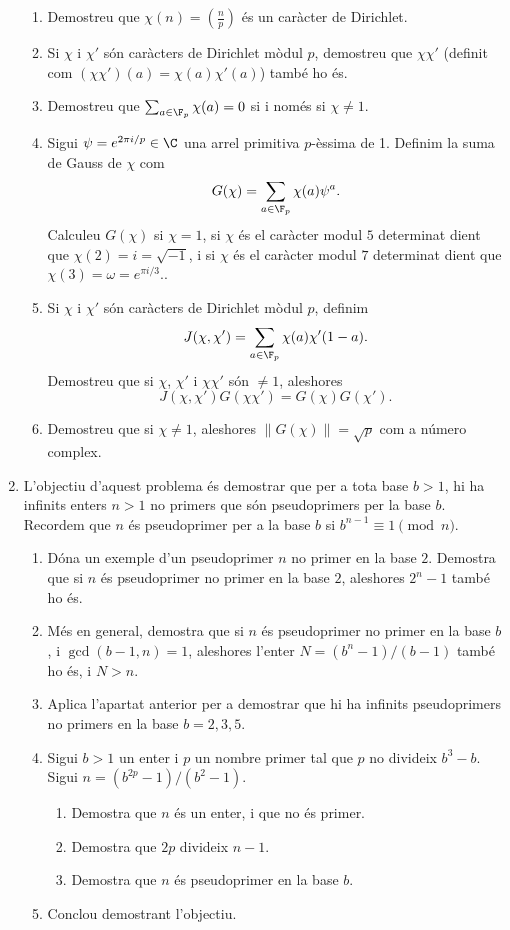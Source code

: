 \begin{enumerate}[leftmargin=*]
\begin{enumerate}
\item  Demostreu que $\chi(n)=\left( \frac np \right)$ és
un caràcter de Dirichlet.

\item   Si $\chi$ i $\chi'$ són caràcters de Dirichlet
mòdul $p$, demostreu que $\chi\chi'$ (definit com $(\chi\chi')(a)=
\chi(a)\chi'(a)$) també ho és.

\item  Demostreu que $\sum_{a\in \F_p} \chi(a)=0$ si i
només si $\chi\ne 1$.

\item Sigui $\psi=e^{2\pi i/p}\in \C$ una arrel primitiva
$p$-\`{e}ssima de 1. Definim la suma de Gauss de $\chi$ com
$$G(\chi)=\sum_{a\in \F_p} \chi(a) \psi^a.$$
Calculeu $G(\chi)$ si $\chi=1$, si $\chi$ és el caràcter
modul $5$ determinat dient que $\chi(2)=i=\sqrt{-1}$, i si $\chi$
és el caràcter modul $7$ determinat dient que
$\chi(3)=\omega = e^{\pi i /3}.$.

\item  Si $\chi$ i $\chi'$ són caràcters de Dirichlet
mòdul $p$, definim $$J(\chi,\chi')=\sum_{a\in \F_p}
\chi(a)\chi'(1-a).$$ Demostreu que si $\chi$, $\chi'$ i $\chi\chi'$
són $\ne 1$, aleshores
$$J(\chi,\chi')G(\chi\chi')=G(\chi)G(\chi').$$

\item Demostreu que si $\chi\ne 1$, aleshores $\| G(\chi)\|
=\sqrt{p}$ com a número complex.

\end{enumerate}



\item L'objectiu d'aquest problema és demostrar que per a
tota base $b>1$, hi ha infinits enters $n>1$ no primers que són
pseudoprimers per la base $b$. Recordem que $n$ és pseudoprimer per
a la base $b$ si $b^{n-1}\equiv 1 \pmod{n}$.

\begin{enumerate}
\item Dóna un exemple d'un pseudoprimer $n$ no primer en la base $2$. Demostra que
si $n$ és pseudoprimer no primer en la base $2$, aleshores $2^n-1$
també ho és.
\item Més en general, demostra que si  $n$ és pseudoprimer no primer en la base
$b$, i $\gcd(b-1,n)=1$, aleshores l'enter $N=(b^n-1)/(b-1)$ també ho
és, i $N>n$.
\item Aplica l'apartat anterior per a demostrar que hi ha infinits
pseudoprimers no primers en la base $b=2,3,5$.
\item Sigui $b>1$ un enter i $p$ un nombre primer tal que $p$ no
divideix $b^3-b$. Sigui $n=(b^{2p}-1)/(b^2-1)$.
\begin{enumerate}
\item Demostra que $n$ és un enter, i que no és primer.
\item Demostra que $2p$ divideix $n-1$.
\item Demostra que $n$ és pseudoprimer en la base $b$.
\end{enumerate}
\item Conclou demostrant l'objectiu.
\end{enumerate}



\end{enumerate}
